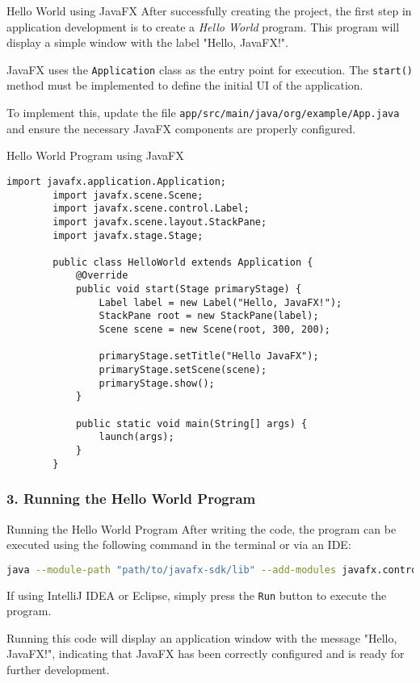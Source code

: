 \documentclass[aspectratio=169, table]{beamer}
\begin{document}
\begin{frame}{Hello World using JavaFX}
	\vspace{20pt}
	After successfully creating the project, the first step in application development is to create a \textit{Hello World} program.  
	This program will display a simple window with the label "Hello, JavaFX!".
	
	\bigskip
	JavaFX uses the \texttt{Application} class as the entry point for execution.  
	The \texttt{start()} method must be implemented to define the initial UI of the application.
	
	\bigskip
	To implement this, update the file \texttt{app/src/main/java/org/example/App.java}  
	and ensure the necessary JavaFX components are properly configured.
\end{frame}


\begin{frame}[fragile]{Hello World Program using JavaFX}
	\vspace{20pt}
	\begin{lstlisting}[style=JavaStyle]
		import javafx.application.Application;
		import javafx.scene.Scene;
		import javafx.scene.control.Label;
		import javafx.scene.layout.StackPane;
		import javafx.stage.Stage;
		
		public class HelloWorld extends Application {
			@Override
			public void start(Stage primaryStage) {
				Label label = new Label("Hello, JavaFX!");
				StackPane root = new StackPane(label);
				Scene scene = new Scene(root, 300, 200);
				
				primaryStage.setTitle("Hello JavaFX");
				primaryStage.setScene(scene);
				primaryStage.show();
			}
			
			public static void main(String[] args) {
				launch(args);
			}
		}
	\end{lstlisting}
\end{frame}

\subsubsection{3. Running the Hello World Program}

\begin{frame}[fragile]{Running the Hello World Program}
	\vspace{20pt}
	After writing the code, the program can be executed using the following command in the terminal or via an IDE:
	
	\begin{lstlisting}[language=bash, caption=Running the Hello World program]
		java --module-path "path/to/javafx-sdk/lib" --add-modules javafx.controls,javafx.fxml -jar HelloWorld.jar
	\end{lstlisting}
	
	If using IntelliJ IDEA or Eclipse, simply press the \texttt{Run} button to execute the program.
	
	Running this code will display an application window with the message "Hello, JavaFX!", indicating that JavaFX has been correctly configured and is ready for further development.
\end{frame}
\end{document}
